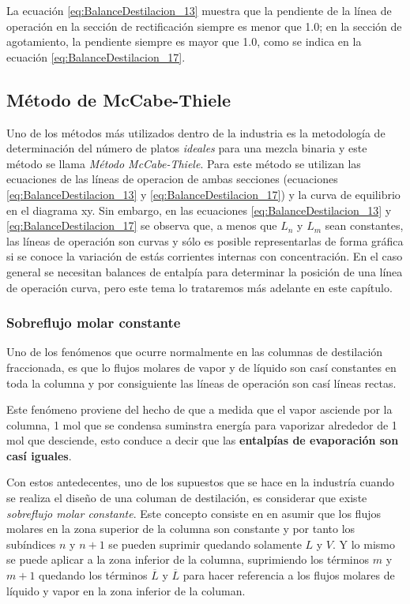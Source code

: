\documentclass[11pt]{book}
\begin{document}
La ecuación \ref{eq:BalanceDestilacion_13} muestra que la pendiente de la línea de operación en la sección de rectificación siempre es menor que 1.0; en la sección de agotamiento, la pendiente siempre es mayor que 1.0, como se indica en la ecuación \ref{eq:BalanceDestilacion_17}.


\subsection{Método de McCabe-Thiele}

Uno de los métodos más utilizados dentro de la industria es la metodología de determinación del número de platos \textit{ideales} para una mezcla binaria y este método se llama \textit{Método McCabe-Thiele}. Para este método se utilizan las ecuaciones de las líneas de operacion de ambas secciones (ecuaciones \ref{eq:BalanceDestilacion_13} y \ref{eq:BalanceDestilacion_17}) y la curva de equilibrio en el diagrama xy. Sin embargo, en las ecuaciones \ref{eq:BalanceDestilacion_13} y \ref{eq:BalanceDestilacion_17} se observa que, a menos que $L_n$ y $L_m$ sean constantes, las líneas de operación son curvas y sólo es posible representarlas de forma gráfica si se conoce la variación de estás corrientes internas con concentración. En el caso general se necesitan balances de entalpía para determinar la posición de una línea de operación curva, pero este tema lo trataremos más adelante en este capítulo.

\subsubsection{Sobreflujo molar constante}

Uno de los fenómenos que ocurre normalmente en las columnas de destilación fraccionada, es que lo flujos molares de vapor y de líquido son casí constantes en toda la columna y por consiguiente las líneas de operación son casí líneas rectas.


Este fenómeno proviene del hecho de que a medida que el vapor asciende por la columna, 1 mol que se condensa suminstra energía para vaporizar alrededor de 1 mol que desciende, esto conduce a decir que las \textbf{entalpías de evaporación son casí iguales}.

Con estos antedecentes, uno de los supuestos que se hace en la industría cuando se realiza el diseño de una columan de destilación, es considerar que existe \textit{sobreflujo molar constante}. Este concepto consiste en en asumir que los flujos molares en la zona superior de la columna son constante y por tanto los subíndices $n$ y $n+1$ se pueden suprimir quedando solamente $L$ y $V$. Y lo mismo se puede aplicar a la zona inferior de la columna, suprimiendo los términos $m$ y $m+1$ quedando los términos $\overline{L}$ y $\overline{L}$ para hacer referencia a los flujos molares de líquido y vapor en la zona inferior de la columan. 
\end{document}
